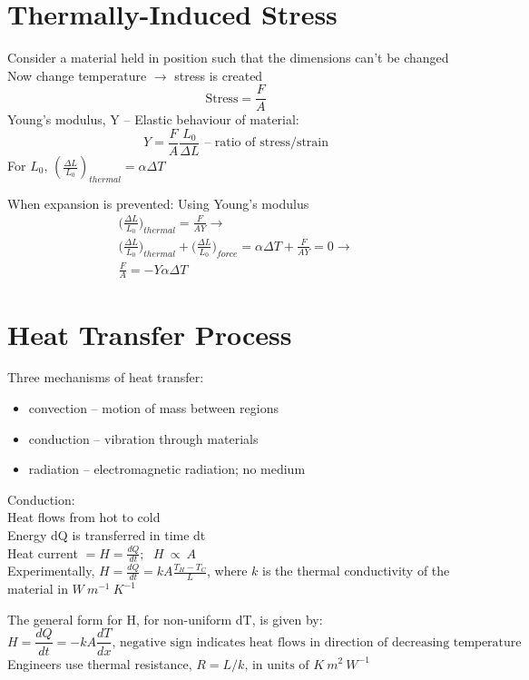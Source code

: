 \documentclass[a4paper, 11pt, fleqn, normalem]{report}
\begin{document}
\section{Thermally-Induced Stress}
Consider a material held in position such that the dimensions can't be changed\\
Now change temperature $\rightarrow$ stress is created
\begin{equation*}
	\text{Stress} = \frac{F}{A}
\end{equation*}
Young's modulus, Y -- Elastic behaviour of material:
\begin{equation*}
	Y = \frac{F}{A}\frac{L_{0}}{{\Delta}L} \text{ -- ratio of stress/strain}
\end{equation*}
For $L_{0}$, $(\frac{{\Delta}L}{L_{0}})_{thermal} = \alpha{\Delta}T$

When expansion is prevented: Using Young's modulus
\begin{gather*}
	\bigg(\frac{{\Delta}L}{L_{0}}\bigg)_{thermal} = \frac{F}{AY} \rightarrow \\
	\bigg(\frac{{\Delta}L}{L_{0}}\bigg)_{thermal} + \bigg(\frac{{\Delta}L}{L_{0}}\bigg)_{force} = \alpha{\Delta}T + \frac{F}{AY} = 0 \rightarrow \\
	\frac{F}{A} = -Y\alpha{\Delta}T
\end{gather*}

\section{Heat Transfer Process}
Three mechanisms of heat transfer:
\begin{itemize}
	\item convection -- motion of mass between regions
	\item conduction -- vibration through materials
	\item radiation -- electromagnetic radiation; no medium
\end{itemize}
Conduction: \\
Heat flows from hot to cold \\
Energy dQ is transferred in time dt \\
Heat current $= H = \frac{dQ}{dt} \text{; }~~ H~\propto~A$ \\
Experimentally, $H = \frac{dQ}{dt} = kA\frac{T_{H}-T_{C}}{L}$, where $k$ is the thermal conductivity of the material in $W~m^{-1}~K^{-1}$

The general form for H, for non-uniform dT, is given by:
\begin{equation*}
	H = \frac{dQ}{dt} = -kA\frac{dT}{dx}\text{, negative sign indicates heat flows in direction of decreasing temperature}
\end{equation*}
Engineers use thermal resistance, $R = L/k \text{, in units of } K~m^{2}~W^{-1}$
\end{document}
